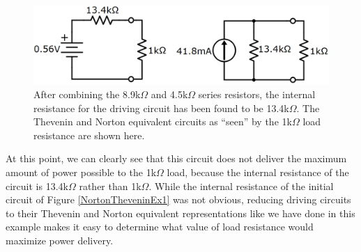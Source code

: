 \begin{figure}[h!]
\centering
\includegraphics[width=15cm]{figures/nortThevEx_8.png}
\caption{After combining the 8.9k$\Omega$ and 4.5k$\Omega$ series resistors, the internal  resistance for the driving circuit has been found to be 13.4k$\Omega$. The Thevenin and Norton equivalent circuits as ``seen'' by the 1k$\Omega$ load resistance are shown here.}
\label{NortonTheveninEx8}
\end{figure}
\par
At this point, we can clearly see that this circuit does not deliver the maximum amount of power possible to the 1k$\Omega$ load, because the internal resistance of the circuit is 13.4k$\Omega$ rather than 1k$\Omega$. While the internal resistance of the initial circuit of Figure \ref{NortonTheveninEx1} was not obvious, reducing driving circuits to their Thevenin and Norton equivalent representations like we have done in this example makes it easy to determine what value of load resistance would maximize power delivery. 

